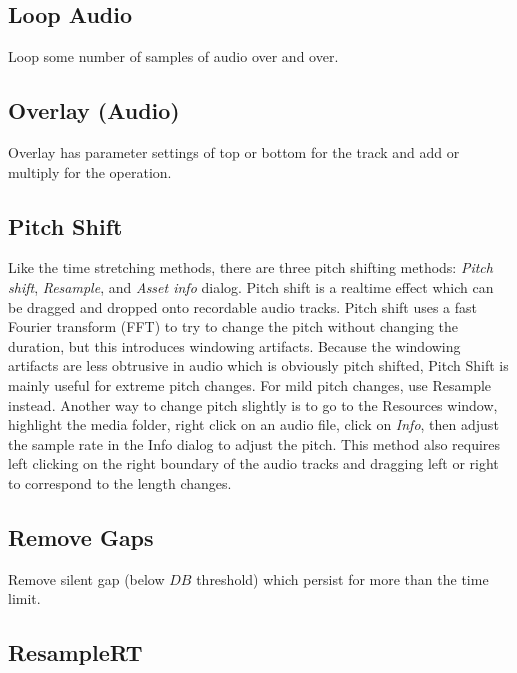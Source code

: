 \subsection{Loop Audio}%
\label{sub:loop_audio}

Loop some number of samples of audio over and over.

\subsection{Overlay (Audio)}%
\label{sub: overlay}

Overlay has parameter settings of top or bottom for the track and add or multiply for the operation.

\subsection{Pitch Shift}%
\label{sub:pitch_shift}

Like the time stretching methods, there are three pitch shifting methods: \textit{Pitch shift}, \textit{Resample}, and \textit{Asset info} dialog. Pitch shift is a realtime effect which can be dragged and dropped onto recordable audio tracks. Pitch shift uses a fast Fourier transform (FFT) to try to change the pitch without changing the duration, but this introduces windowing artifacts. Because the windowing artifacts are less obtrusive in audio which is obviously pitch shifted, Pitch Shift is mainly useful for extreme pitch changes. For mild pitch changes, use Resample instead. Another way to change pitch slightly is to go to the Resources window, highlight the media folder, right click on an audio file, click on \textit{Info}, then adjust the sample rate in the Info dialog to adjust the pitch. This method also requires left clicking on the right boundary of the audio tracks and dragging left or right to correspond to the length changes.

\subsection{Remove Gaps}%
\label{sub:remove_gaps}

Remove silent gap (below $DB$ threshold) which persist for more than the time limit.

\subsection{ResampleRT}%
\label{sub:resamplert}

